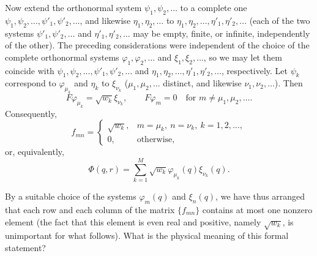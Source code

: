 \documentclass[fontsize=13pt,twoside,openany,headings=normal,parskip=false,bookmarkpackage=false,DIV=calc]{scrbook}
\begin{document}
Now extend the orthonormal system $\psi_1,\allowbreak \psi_2,\allowbreak \ldots$ to a complete one $\psi_1,\allowbreak \psi_2,\allowbreak \ldots,\allowbreak \psi'_1,\allowbreak \psi'_2,\allowbreak \ldots$, and likewise $\eta_1,\allowbreak \eta_2,\allowbreak \ldots$ to $\eta_1,\allowbreak \eta_2,\allowbreak \ldots,\allowbreak \eta'_1,\allowbreak \eta'_2,\allowbreak \ldots$ (each of the two systems $\psi'_1,\allowbreak \psi'_2,\allowbreak \ldots$ and $\eta'_1,\allowbreak \eta'_2,\allowbreak \ldots$ may be empty, finite, or infinite, independently of the other). The preceding considerations were independent of the choice of the complete orthonormal systems $\varphi_1,\allowbreak \varphi_2,\allowbreak \ldots$ and $\xi_1,\allowbreak \xi_2,\allowbreak \ldots$, so we may let them coincide with $\psi_1,\allowbreak \psi_2,\allowbreak \ldots,\allowbreak \psi'_1,\allowbreak \psi'_2,\allowbreak \ldots$ and $\eta_1,\allowbreak \eta_2,\allowbreak \ldots,\allowbreak \eta'_1,\allowbreak \eta'_2,\allowbreak \ldots$, respectively. Let $\psi_k$ correspond to $\varphi_{\mu_k}$ and $\eta_k$ to $\xi_{\nu_k}$ ($\mu_1,\allowbreak \mu_2,\allowbreak \ldots$ distinct, and likewise $\nu_1,\allowbreak \nu_2,\allowbreak \ldots$). Then
\[
 F\varphi_{\mu_k}=\sqrt{w_k}\xi_{\nu_k},\qquad
 F\varphi_m=0\quad\text{for }m\ne\mu_1,\mu_2,\ldots.
\]
Consequently,
\[
 f_{mn}=\begin{cases}\sqrt{w_k},&m=\mu_k,\ n=\nu_k,\ k=1,2,\ldots,\\
 0,&\text{otherwise},\end{cases}
\]
or, equivalently,
\[
 \Phi(q,r)=\sum_{k=1}^{M}\sqrt{w_k}\varphi_{\mu_k}(q)\xi_{\nu_k}(q).
\]

By a suitable choice of the systems $\varphi_m(q)$ and $\xi_n(q)$, we have thus arranged that each row and each column of the matrix $\{f_{mn}\}$ contains at most one nonzero element (the fact that this element is even real and positive, namely $\sqrt{w_k}$, is unimportant for what follows). What is the physical meaning of this formal statement?
\end{document}

